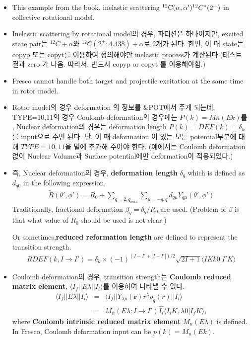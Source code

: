 \documentclass[11pt]{book}
\def\bm{\boldsymbol}
\def\vr{{\bm r}}
\def\la{\langle}
\def\ra{\rangle}
\newcommand{\bea}{\begin{eqnarray}}
\newcommand{\eea}{\end{eqnarray}}
\newcommand{\no}{\nonumber \\}
\begin{document}
\begin{itemize} 
\item This example from the book. inelastic scattering 
      ${}^{12}{\rm C}(\alpha,\alpha')^{12}C^*(2^+)$ in collective rotational model. 

\item Inelastic scattering by rotational model의 경우, 
파티션은 하나이지만, excited state pair는 
${}^{12}C+\alpha$와 ${}^{12}C(2^+;4.438)+\alpha$로 2개가 된다. 
한편, 이 때 state는 copyp 또는 copyt를 이용하여 정의해야만
inelastic process가 계산된다.(테스트 결과 zero 가 나옴. 따라서,
{\color{red} 반드시 copyp or copyt 를 이용해야함.}) 

\item Fresco cannot handle both target and projectile excitation at the same time in rotor model. 

\item Rotor model의 경우 deformation 의 정보를 \&POT에서 주게 되는데,
TYPE=10,11의 경우
Coulomb deformation의 경우에는 $P(k)=Mn(Ek)$를 , Nuclear deformation의 
경우는 deformation length $P(k)=DEF(k)=\delta_k$를 input으로 주면 된다. 
단, 이 때 deformation 이 있는 모든 potential부분에 대해 $TYPE=10,11$을
밑에 추가해 주어야 한다. (예에서는 Coulomb deformation 없이 
Nuclear Volume과 Surface potential에만 deformation이 적용되었다.)

\item 즉, Nuclear deformation의 경우, {\bf deformation length} $\delta_q$ which is defined as
$d_{q0}$ in the following expression,  
\bea 
\tilde{R}(\theta',\phi') = R_0+ \sum_{q=2,q_{max}} \sum_{\mu=-q,q} d_{q\mu} Y_{q\mu}(\theta',\phi')
\eea 
Traditionally, fractional deformation $\beta_q= \delta_q/ R_0$ are used.  
(Problem of $\beta$ is that what value of $R_0$ should be used is not clear.)

Or sometimes,{\bf  reduced reformation length } are defined to represent the transition strength. 
\bea 
RDEF(k,I\to I') =  \delta_k\times (-1)^{(I-I'+|I-I'|)/2} \sqrt{2I+1}\la I K k 0| I' K\ra 
\eea 

\item Coulomb deformation의 경우, transition strength는 {\bf Coulomb reduced matrix element}, 
$\la I_f||E\lambda||I_i\ra$를 이용하여 나타낼 수 있다.  
\bea 
\la I_f||E\lambda||I_i\ra &=& \la I_f|| Y_{\lambda\mu}(\vr) r^\lambda \rho_q(r)|| I_i\ra \no 
  &=& M_n(E\lambda;I\to I') \hat{I_i} \la I_i K,\lambda 0| I_f K\ra ,
\eea 
where {\bf Coulomb intrinsic reduced matrix element} $M_n(E\lambda)$ is defined. 
In Fresco, Coulomb deformation input can be $p(k)=M_n(Ek)$. 


\end{itemize}
\end{document}
